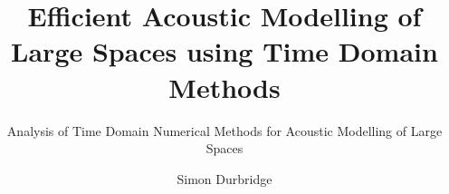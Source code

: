 \documentclass[graybox,envcountchap,sectrefs]{svmono}
\begin{document}
\author{Simon Durbridge} %

\title{Efficient Acoustic Modelling of Large Spaces using Time Domain Methods} %

\subtitle{Analysis of Time Domain Numerical Methods for Acoustic Modelling of Large Spaces}
\maketitle

\frontmatter%

%
%
%
%

\tableofcontents
%

\mainmatter%
%


\backmatter%

%
%

\end{document}
